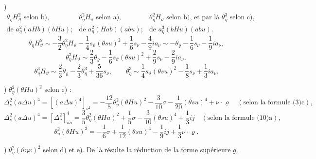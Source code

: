 \documentclass[11pt]{article}
\newcommand{\A}{\Delta}
\newcommand{\R}{\varrho}
\begin{document}
)
\[
\begin{array}{ccc}
\theta_\eta H_\vartheta^2\text{ selon b)},&
\theta_\eta^2H_\vartheta\text{ selon a)},&
\theta_\eta^2H_\vartheta\text{ selon b), et par là }\theta_\eta^3\text{ selon c)},\\
\text{de }a_\eta^2(aHb)(bHu);&
\text{de }a_\eta^2(Hab)(abu);&
\text{de }a_\eta^3(bHu)(abu).
\end{array}
\]
\[
\theta_\eta H_\vartheta^2\sim-\frac32\theta_\eta^2H_\vartheta-\frac14s_\vartheta(\theta su)^2+\frac16s_\nu-\frac49ia_\nu
\sim-\theta_\R-\frac16s_\nu-\frac19ia_\nu,
\]
\[
\theta_\eta^2H_\vartheta\sim\frac23\theta_\R-\frac16s_\vartheta(\theta su)^2+\frac29s_\nu-\frac29ia_\nu,
\]
\[
\theta_\eta^3H_\vartheta\sim\frac23\theta_\R-\frac23\theta_\eta^3+\frac5{36}s_\nu,
\qquad
\theta_\eta^3\sim\frac14s_\vartheta(\theta su)^2-\frac18s_\nu+\frac13ia_\nu.
\]

) $\theta_\eta^2(\theta Hu)^2$ selon e) :
\[
\A_\nu^2(a\A u)^4=[(a\A u)^4]_{\nu^2}
=-\frac{12}{5}\theta_\eta^2(\theta Hu)^2-\frac3{10}\sigma-\frac1{20}(\theta su)^4+\nu\cdot\R
\quad(\text{selon la formule (3)c}),
\]
\[
\A_\nu^2(a\A u)^4=[\A_\nu^2]^4_{\widehat{u a}}=\frac35\theta_\eta^2(\theta Hu)^2+\frac15\sigma-\frac3{10}(\theta su)^4+\frac13ij
\quad(\text{selon la formule (10)a}),
\]
\[
\theta_\eta^2(\theta Hu)^2=-\frac16\sigma+\frac1{12}(\theta su)^4-\frac19ij+\frac13\nu\cdot\R.
\]

) $\theta_\eta^2(\vartheta\eta x)^2$ selon d) et e). De là résulte la réduction de la forme supérieure $g$.
\end{document}
